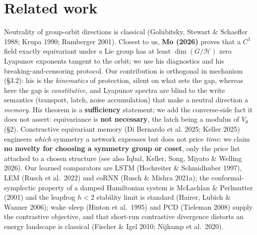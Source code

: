 \documentclass[10pt]{article}
\begin{document}
\section{Related work}

Neutrality of group-orbit directions is classical (Golubitsky, Stewart \& Schaeffer 1988; Krupa 1990; Rumberger 2001). Closest to us, \textbf{Mo (2026)} proves that a $C^1$ field exactly equivariant under a Lie group has at least $\dim(G/\mathcal H)$ zero Lyapunov exponents tangent to the orbit; we use his diagnostics and his breaking-and-censoring protocol. Our contribution is orthogonal in mechanism (\S3.2): his is the \emph{kinematics} of protection, silent on what sets the gap, whereas here the gap is \emph{constitutive}, and Lyapunov spectra are blind to the write semantics (transport, latch, noise accumulation) that make a neutral direction a \emph{memory}. His theorem is a \textbf{sufficiency} statement; we add the converse-side fact it does not assert: equivariance is \textbf{not necessary}, the latch being a modulus of $V_\theta$ (\S2). Constructive equivariant memory (Di Bernardo et al. 2025; Keller 2025) engineers \emph{which} symmetry a network expresses but does not price \emph{time}: we claim \textbf{no novelty for choosing a symmetry group or coset}, only the price list attached to a chosen structure (see also Iqbal, Keller, Song, Miyato \& Welling 2026). Our learned comparators are LSTM (Hochreiter \& Schmidhuber 1997), LEM (Rusch et al.\ 2022) and coRNN (Rusch \& Mishra 2021a); the conformal-symplectic property of a damped Hamiltonian system is McLachlan \& Perlmutter (2001) and the leapfrog $h<2$ stability limit is standard (Hairer, Lubich \& Wanner 2006); wake--sleep (Hinton et al.\ 1995) and PCD (Tieleman 2008) supply the contrastive objective, and that short-run contrastive divergence distorts an energy landscape is classical (Fischer \& Igel 2010; Nijkamp et al.\ 2020).
\end{document}
